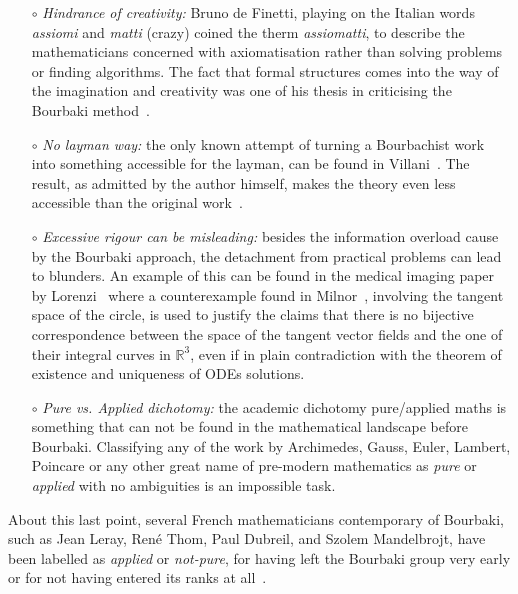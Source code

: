 \documentclass[]{scrartcl}
\theoremstyle{definition}
\begin{document}
\begin{itemize}
    \item[$\circ$] \emph{Hindrance of creativity:} Bruno de Finetti, playing on the Italian words \emph{assiomi} and \emph{matti} (crazy) coined the therm \emph{assiomatti}, to describe the mathematicians concerned with axiomatisation rather than solving problems or finding algorithms. The fact that formal structures comes into the way of the imagination and creativity was one of his thesis in criticising the Bourbaki method~\cite{de2008bruno}.

    \item[$\circ$] \emph{No layman way:} the only known attempt of turning a Bourbachist work into something accessible for the layman, can be found in Villani~\cite{villani2003livingtheorem}. The result, as admitted by the author himself, makes the theory even less accessible than the original 
    work~\cite{moskowitz2015truth}.
    
    \item[$\circ$] \emph{Excessive rigour can be misleading:} besides the information overload cause by the Bourbaki approach, the detachment from practical problems can lead to blunders. An example of this can be found in the medical imaging paper by Lorenzi~\cite{lorenzi2013geodesics} where a counterexample found in Milnor~\cite{milnor1984remarks}, involving the tangent space of the circle, is used to justify the claims that there is no bijective correspondence between the space of the tangent vector fields and the one of their integral curves in $\mathbb{R}^3$, even if in plain contradiction with the theorem of existence and uniqueness of ODEs solutions.

    \item[$\circ$] \emph{Pure vs. Applied dichotomy:} the academic dichotomy pure/applied maths is something that can not be found in the mathematical landscape before Bourbaki. 
    Classifying any of the work by Archimedes, Gauss, Euler, Lambert, Poincare or any other great name of pre-modern mathematics as \emph{pure} or \emph{applied} with no ambiguities is an impossible task.
     
\end{itemize}

About this last point, several French mathematicians contemporary of Bourbaki, such as Jean Leray, René Thom, Paul Dubreil, and Szolem Mandelbrojt, have been labelled as \emph{applied} or \emph{not-pure}, for having left the Bourbaki group very early or for not having entered its ranks at all~\cite{barcellos1984interview, atiyah2007bourbaki}.
\end{document}
